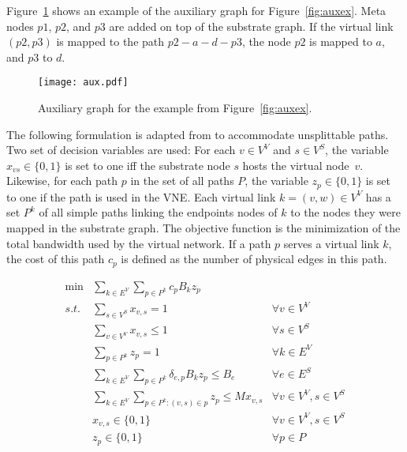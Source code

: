 \documentclass[conference]{IEEEtran}
\begin{document}
Figure~\ref{fig:aux} shows an example of the auxiliary graph for Figure~\ref{fig:auxex}.
Meta nodes $p1$, $p2$, and $p3$ are added on top of the substrate graph. If the virtual link $(p2, p3)$ is mapped to the path $p2-a-d-p3$, the node $p2$ is mapped to $a$, and $p3$ to $d$.

\begin{figure}[h!]
  \centering
  \texttt{[image: aux.pdf]}
  \caption{Auxiliary graph for the example from Figure~\ref{fig:auxex}.\label{fig:aux}}
\end{figure}

The following formulation is adapted from \cite{hu:2013} to accommodate unsplittable paths. 
Two set of decision variables are used: For each $v \in V^{V}$ and $s \in V^{S}$, the variable $x_{vs} \in \{0,1\}$ is set to one iff the substrate node $s$ hosts the virtual node~$v$. 
Likewise, for each path $p$ in the set of all paths $P$, the variable $z_{p} \in \{0,1\}$ is set to one if the path is used in the VNE. 
Each virtual link $k=(v,w) \in V^V$ has a set $P^k$ of all simple paths linking the endpoints nodes of $k$ to the nodes they were mapped in the substrate graph.
The objective function is the minimization of the total bandwidth used by the virtual network. If a path $p$ serves a virtual link $k$, the cost of this path $c_{p}$ is defined as the number of physical edges in this path.

\begin{align}
  \min  & \sum\limits_{k \in E^{V}}\sum\limits_{p \in P^k}  c_{p} B_k z_{p}        \nonumber \\
  s.t.  & \sum\limits_{s \in V^{S}} x_{v,s} = 1                                  & \forall v \in V^{V} \label{eq:virone} \\
        & \sum\limits_{v \in V^{V}} x_{v,s} \leq 1                               & \forall s \in V^{S} \label{eq:subone} \\
        & \sum\limits_{p \in P^{k}} z_{p} = 1                                    & \forall k \in E^{V} \label{eq:virdemone} \\
        & \sum\limits_{k \in E^{V}}\sum\limits_{p \in P^{k}} \delta_{e,p} B_{k} z_{p} \leq B_{e} & \forall e \in E^{S} \label{eq:bandwidth} \\
        & \sum\limits_{k \in E^{V}}\sum\limits_{p \in P^k : (v,s) \in p} z_{p} \leq M x_{v,s} & \forall v \in V^{V}, s \in V^{S} \label{eq:onlyoneaux}\\
        &  x_{v,s} \in \{0,1\}  & \forall v \in V^{V}, s \in V^{S} \nonumber \\
        & z_{p} \in \{0,1\}    & \forall p \in {P} \nonumber
\end{align}
\end{document}

